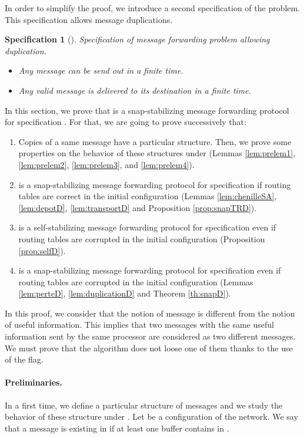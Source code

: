 \documentclass[11pt]{article}
\newtheorem{specification}{Specification}
\begin{document}
In order to simplify the proof, we introduce a second specification of the problem. This specification allows message duplications.
      
\begin{specification} []
Specification of message forwarding problem allowing duplication.
\begin{itemize}
\item Any message can be send out in a finite time.
\item Any valid message is delivered to its destination in a finite time.
\end{itemize}
\end{specification}

In this section, we prove that \AD is a snap-stabilizing message forwarding protocol for specification . For that, we are going to prove successively that:

\begin{enumerate}
\item Copies of a same message have a particular structure. Then, we prove some properties on the behavior of these structures under \AD(Lemmas \ref{lem:prelem1}, \ref{lem:prelem2}, \ref{lem:prelem3}, and \ref{lem:prelem4}).
\item \AD is a snap-stabilizing message forwarding protocol for specification  if routing tables are correct in the initial configuration (Lemmas \ref{lem:chenilleSA}, \ref{lem:depotD}, \ref{lem:transportD} and Proposition \ref{prop:snapTRD}). 
\item \AD is a self-stabilizing message forwarding protocol for specification  even if routing tables are corrupted in the initial configuration (Proposition \ref{prop:selfD}).
\item \AD is a snap-stabilizing message forwarding protocol for specification  even if routing tables are corrupted in the initial configuration (Lemmas \ref{lem:perteD}, \ref{lem:duplicationD} and Theorem \ref{th:snapD}).
\end{enumerate}

In this proof, we consider that the notion of message is different from the notion of useful information. This implies that two messages with the same useful information sent by the same processor are considered as two different messages. We must prove that the algorithm does not loose one of them thanks to the use of the flag.

\paragraph{Preliminaries.}In a first time, we define a particular structure of messages and we study the behavior of these structure under \AD. Let  be a configuration of the network. We say that a message  is existing in  if at least one buffer contains  in .
\end{document}
